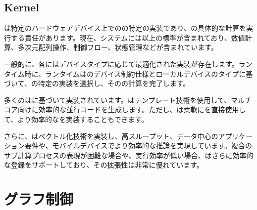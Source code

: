 \begin{content}
\subsection{Kernel}

は特定のハードウェアデバイス上でのの特定の実装であり、の具体的な計算を実行する責任があります。現在、システムには以上の標準が含まれており、数値計算、多次元配列操作、制御フロー、状態管理などが含まれています。

一般的に、各にはデバイスタイプに応じて最適化された実装が存在します。ランタイム時に、ランタイムはのデバイス制約仕様とローカルデバイスのタイプに基づいて、の特定の実装を選択し、そのの計算を完了します。

多くのはに基づいて実装されています。はテンプレート技術を使用して、マルチコア向けに効率的な並行コードを生成します。ただし、は柔軟にを直接使用して、より効率的なを実装することもできます。

さらに、はベクトル化技術を実装し、高スループット、データ中心のアプリケーション要件や、モバイルデバイスでより効率的な推論を実現しています。複合のサブ計算プロセスの表現が困難な場合や、実行効率が低い場合、はさらに効率的な登録をサポートしており、その拡張性は非常に優れています。

\end{content}

\section{グラフ制御}

